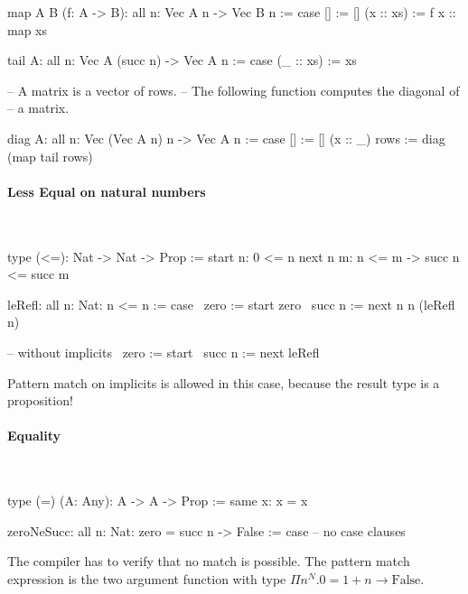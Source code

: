 \begin{alba}
    map {A B} (f: A -> B): all {n}: Vec A n -> Vec B n
    := case
        [] := []
        (x :: xs) :=
            f x :: map xs

    tail {A}: all {n}: Vec A (succ n) -> Vec A n
    := case
        (_ :: xs) := xs
\end{alba}

\begin{alba}
    -- A matrix is a vector of rows.
    -- The following function computes the diagonal of
    -- a matrix.

    diag {A}: all {n}: Vec (Vec A n) n -> Vec A n
    := case
        [] :=
            []
        (x :: _) rows :=
            diag (map tail rows)
\end{alba}





\paragraph{Less Equal on natural numbers}


\ \begin{alba}
    type (<=): Nat -> Nat -> Prop :=
        start {n}:    0 <= n
        next  {n m}:  n <= m -> succ n <= succ m

    leRefl: all {n: Nat}: n <= n := case
        \ {zero}   := start {zero}
        \ {succ n} := next {n} {n} (leRefl {n})

        -- without implicits
        \ {zero}   := start
        \ {succ n} := next leRefl
\end{alba}

Pattern match on implicits is allowed in this case, because the result type is a
proposition!




\paragraph{Equality}

\ \begin{alba}
    type (=) (A: Any): A -> A -> Prop :=
        same {x}: x = x

    zeroNeSucc: all {n: Nat}: zero = succ n -> False :=
        case
            -- no case clauses
\end{alba}

The compiler has to verify that no match is possible. The pattern match
expression is the two argument function with type $\Pi n^N. 0 = 1 + n \to
\text{False}$.



